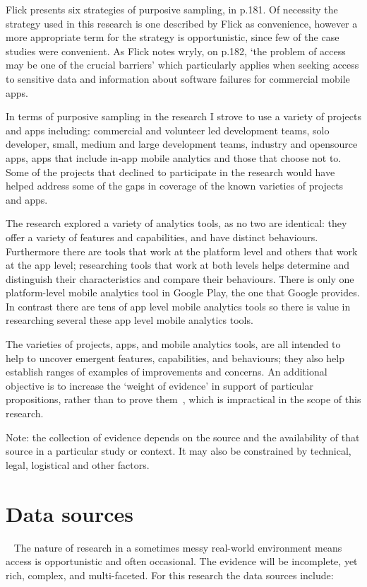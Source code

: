 Flick presents six strategies of purposive sampling, in p.181. Of necessity the strategy used in this research is one described by Flick as convenience, however a more appropriate term for the strategy is opportunistic, since few of the case studies were convenient. As Flick notes wryly, on p.182, `the problem of access may be one of the crucial barriers' which particularly applies when seeking access to sensitive data and information about software failures for commercial mobile apps.

In terms of purposive sampling in the research I strove to use a variety of projects and apps including: commercial and volunteer led development teams, solo developer, small, medium and large development teams, industry and opensource apps, apps that include in-app mobile analytics and those that choose not to. Some of the projects that declined to participate in the research would have helped address some of the gaps in coverage of the known varieties of projects and apps.

The research explored a variety of analytics tools, as no two are identical: they offer a variety of features and capabilities, and have distinct behaviours.  Furthermore there are tools that work at the platform level and others that work at the app level; researching tools that work at both levels helps determine and distinguish their characteristics and compare their behaviours. There is only one platform-level mobile analytics tool in Google Play, the one that Google provides. In contrast there are tens of app level mobile analytics tools so there is value in researching several these app level mobile analytics tools.

The varieties of projects, apps, and mobile analytics tools, are all intended to help to uncover emergent features, capabilities, and behaviours; they also help establish ranges of examples of improvements and concerns. An additional objective is to increase the `weight of evidence' in support of particular propositions, rather than to prove them~\citep[see p.569]{seaman1999_qualitative_methods_in_esse}, which is impractical in the scope of this research.

Note: the collection of evidence depends on the source and the availability of that source in a particular study or context. It may also be constrained by technical, legal, logistical and other factors.

\section{Data sources}~\label{methodology-data-sources}
The nature of research in a sometimes messy real-world environment means access is opportunistic and often occasional. The evidence will be incomplete, yet rich, complex, and multi-faceted. For this research the data sources include:

